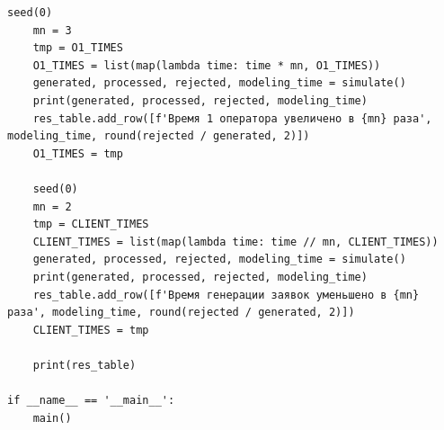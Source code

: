 \documentclass[14pt, a4paper]{extarticle}
\begin{document}
\begin{lstlisting}[caption = {Код разработанной программы}, label=lst:list1]
	seed(0)
	mn = 3
	tmp = O1_TIMES
	O1_TIMES = list(map(lambda time: time * mn, O1_TIMES))
	generated, processed, rejected, modeling_time = simulate()
	print(generated, processed, rejected, modeling_time)
	res_table.add_row([f'Время 1 оператора увеличено в {mn} раза', modeling_time, round(rejected / generated, 2)])
	O1_TIMES = tmp
	
	seed(0)
	mn = 2
	tmp = CLIENT_TIMES
	CLIENT_TIMES = list(map(lambda time: time // mn, CLIENT_TIMES))
	generated, processed, rejected, modeling_time = simulate()
	print(generated, processed, rejected, modeling_time)
	res_table.add_row([f'Время генерации заявок уменьшено в {mn} раза', modeling_time, round(rejected / generated, 2)])
	CLIENT_TIMES = tmp

	print(res_table)

if __name__ == '__main__':
	main()
\end{lstlisting}
\end{document}
